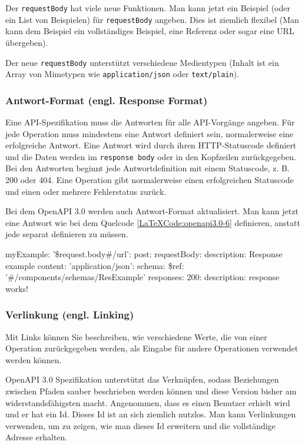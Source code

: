 Der \texttt{requestBody} hat viele neue Funktionen. Man kann jetzt ein Beispiel (oder ein List von Beispielen) für \texttt{requestBody} angeben. Dies ist ziemlich flexibel (Man kann dem Beispiel ein vollständiges Beispiel, eine Referenz oder sogar eine URL übergeben).

Der neue \texttt{requestBody} unterstützt verschiedene Medientypen (Inhalt ist ein Array von Mimetypen wie \texttt{application/json} oder \texttt{text/plain}).

\subsubsection{Antwort-Format (engl. Response Format)}

Eine API-Spezifikation muss die Antworten für alle API-Vorgänge angeben. Für jede Operation muss mindestens eine Antwort definiert sein, normalerweise eine erfolgreiche Antwort. Eine Antwort wird durch ihren HTTP-Statuscode definiert und die Daten werden im \texttt{response body} oder in den Kopfzeilen zurückgegeben. Bei den Antworten beginnt jede Antwortdefinition mit einem Statuscode, z. B. 200 oder 404. Eine Operation gibt normalerweise einen erfolgreichen Statuscode und einen oder mehrere Fehlerstatus zurück\cite{openapiresponsebody17}.

Bei dem OpenAPI 3.0 werden auch Antwort-Format aktualisiert. Man kann jetzt eine Antwort wie bei dem Quelcode \ref{LaTeXCode:openapi3.0-6} definieren, anstatt jede separat definieren zu müssen.

\begin{LaTeXCode}[caption={Open API 3.0 - Antwort-Format},captionpos=b, label=LaTeXCode:openapi3.0-6][numbers=none]
myExample:
	'\$request.body#/url':
	post:
		requestBody:
		  description: Response example
	    content:
		  'application/json':
		    schema:
			  \$ref: '#/components/schemas/ResExample'
			responses:
			  200:
			  description: response works!
\end{LaTeXCode}


\subsubsection{Verlinkung (engl. Linking)}

Mit Links können Sie beschreiben, wie verschiedene Werte, die von einer Operation zurückgegeben werden, als Eingabe für andere Operationen verwendet werden können\cite{openapilinks17}.

OpenAPI 3.0 Spezifikation unterstützt das Verknüpfen, sodass Beziehungen zwischen Pfaden sauber beschrieben werden können und diese Version bisher am widerstandsfähigsten macht. Angenommen, dass es einen Benutzer erhielt wird und er hat ein Id. Dieses Id ist an sich ziemlich nutzlos. Man kann Verlinkungen verwenden, um zu zeigen, wie man dieses Id erweitern und die vollständige Adresse erhalten.

